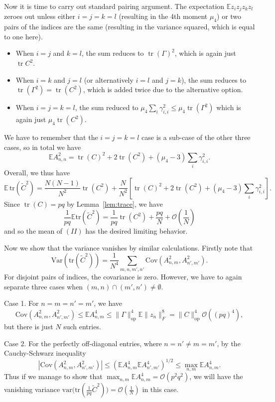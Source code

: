 \documentclass[12pt]{article}
\newcommand{\E}{\mathbb{E}}
\newcommand{\cov}{\mathrm{Cov}}
\newcommand{\tr}{\operatorname{tr}}
\newcommand{\op}{\mathrm{op}}
\begin{document}
Now it is time to carry out standard pairing argument. The expectation $\E z_i z_j z_k z_l$ zeroes out unless either $i=j=k=l$ (resulting in the 4th moment $\mu_4$) or two pairs of the indices are the same (resulting in the variance squared, which is equal to one here).
\begin{itemize}
  \item When $i=j$ and $k=l$, the sum reduces to $\tr(\Gamma)^2$, which is again just $\tr{C}^2$.
  \item When $i=k$ and $j=l$ (or alternatively $i=l$ and $j=k$), the sum reduces to $\tr(\Gamma^2) = \tr(C^2)$, which is added twice due to the alternative option.
  \item When $i=j=k=l$, the sum reduced to $\mu_4 \sum_i \gamma_{i,i}^2 \leq \mu_4 \tr(\Gamma^2)$ which is again just $\mu_4 \tr(C^2)$.
\end{itemize}
We have to remember that the $i=j=k=l$ case is a sub-case of the other three cases, so in total we have
\[
\E A_{n,n}^2 = \tr(C)^2 + 2 \tr(C^2)+(\mu_4-3)\sum_i \gamma_{i,i}^2.
\]
Overall, we thus have
\[
\E\, \mathrm{tr}(\widetilde C^2) = \frac{N(N-1)}{N^2} \tr(C^2) + \frac{N}{N^2}\left[ \tr(C)^2 + 2 \tr(C^2) + (\mu_4 - 3) \sum_i \gamma_{i,i}^2 \right].
\]
Since $\tr(C)=pq$ by Lemma~\ref{lem:trace}, we have
\[
\frac{1}{pq}\E \mathrm{tr}(\widetilde C^2) = \frac{1}{pq}\tr(C^2)+\frac{pq}{N} + \mathcal{O}\left(\frac{1}{N}\right)
\]
and so the mean of $(II)$ has the desired limiting behavior.

Now we show that the variance vanishes by similar calculations. Firstly note that
\[
\mathrm{Var}(\mathrm{tr}(\widetilde C^2)) = \frac{1}{N^4} \sum_{m,n,m',n'} \cov(A_{n,m}^2,A_{n',m'}^2).
\]
For disjoint pairs of indices, the covariance is zero. However, we have to again separate three cases when $(m,n) \cap(m',n')\neq\emptyset$.

Case 1. For $n=m=n'=m'$, we have
\[
\cov(A_{n,m}^2,A_{n',m'}^2) \leq \E A_{n,m}^4 \leq \|\Gamma\|_{\text{op}}^4\E \|z_n\|_F^8 = \|C\|_\op^4 \mathcal{O}((pq)^4),
\]
but there is just $N$ such entries.

Case 2. For the perfectly off-diagonal entries, where $n=n'\neq m=m'$, by the Cauchy-Schwarz inequality
\[
|\cov(A_{n,m}^2,A_{n',m'}^2)| \leq \left( \E A_{n,m}^4 \E A_{n',m'}^4 \right)^{1/2} \leq \max_{n,m} \E A_{n,m}^4.
\]
Thus if we manage to show that $\max_{n,m} \E A_{n,m}^4 = \mathcal{O}(p^2q^2)$, we will have the vanishing variance $\mathrm{var}\big(\mathrm{tr}(\frac{1}{pq}\widetilde C^2)\big) = \mathcal{O}(\frac{1}{N})$ in this case.
\end{document}
